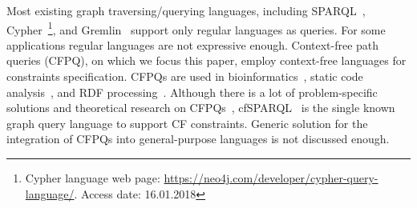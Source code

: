 Most existing graph traversing/querying languages, including SPARQL~\cite{sparql}, Cypher~\footnote{Cypher language web page: \url{https://neo4j.com/developer/cypher-query-language/}. Access date: 16.01.2018}, and Gremlin~\cite{gremlin} support only regular languages as queries. 
For some applications regular languages are not expressive enough. 
Context-free path queries (CFPQ), on which we focus this paper, employ context-free languages for constraints specification. 
CFPQs are used in bioinformatics~\cite{GraphQueryWithEarley}, static code analysis~\cite{Reps, Zheng, LabelFlowCFLReachability, specificationCFLReachability, JavaCFL}, and RDF processing~\cite{CFGonRDF}. 
Although there is a lot of problem-specific solutions and theoretical research on CFPQs~\cite{Yannakakis, ConjCFPathQuery, Hellings16, GrigorevR16, QueryGraphWithData, RegularDBQuery, GraphQueryWithEarley, graphDB}, cfSPARQL~\cite{CFGonRDF} is the single known graph query language to support CF constraints. 
Generic solution for the integration of CFPQs into general-purpose languages is not discussed enough. 


